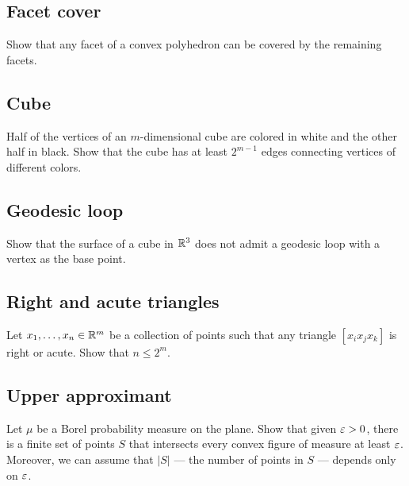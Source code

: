 \subsection*{Facet cover}\label{Facet cover}

\begin{pr}
Show that any facet of a convex polyhedron can be covered by the remaining facets.
\end{pr}


\subsection*{Cube}\label{Cube}

\begin{pr}
Half of the vertices 
of an $m$-dimensional cube
are colored in white and the other half in black.
Show that the cube has at least $2^{m-1}$ edges connecting vertices of different colors. 
\end{pr}

\subsection*{Geodesic loop}\label{Geodesic loop}

\begin{pr}
Show that the surface of a cube in $\mathbb{R}^3$
does not admit a geodesic loop with a vertex as the base point.
\end{pr}

\subsection*{Right and acute triangles}\label{Right and acute triangles}

\begin{pr}
Let $x_1,\ldots,x_n\in\mathbb{R}^m$
be a collection of points such that any triangle $[x_ix_jx_k]$ is right or acute.
Show that $n\le 2^m$.
\end{pr}

\subsection*{Upper approximant}\label{One-sided approximants}

\begin{pr}
Let $\mu$ be a Borel probability measure on the plane.
Show that given $\varepsilon>0$, there is a finite set of points $S$ that intersects every convex figure of measure at least $\varepsilon$.
Moreover, we can assume that $|S|$ --- the number of points in $S$ --- depends only on $\varepsilon$.
\end{pr}

